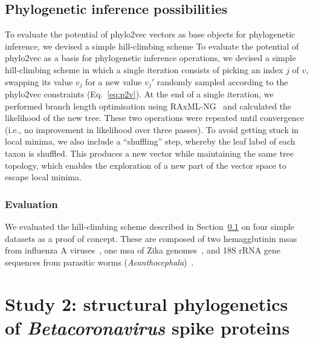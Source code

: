 \subsection{Phylogenetic inference possibilities}
\label{methods:p2v_inference}
To evaluate the potential of phylo2vec vectors as base objects for phylogenetic inference, we devised a simple hill-climbing scheme
To evaluate the potential of phylo2vec as a basis for phylogenetic inference operations, we devised a simple hill-climbing scheme in which a single iteration consists of picking an index $j$ of $v$, swapping its value $v_j$ for a new value $v_j'$ randomly sampled according to the phylo2vec constraints (Eq.~\ref{eq:p2v}). At the end of a single iteration, we performed branch length optimisation using RAxML-NG~\cite{kozlov2019} and calculated the likelihood of the new tree. These two operations were repeated until convergence (i.e., no improvement in likelihood over three passes). To avoid getting stuck in local minima, we also include a “shuffling” step, whereby the leaf label of each taxon is shuffled. This produces a new vector while maintaining the same tree topology, which enables the exploration of a new part of the vector space to escape local minima.

\subsubsection{Evaluation}
\label{methods:p2v_evaluation}
We evaluated the hill-climbing scheme described in Section~\ref{methods:p2v_inference} on four simple datasets as a proof of concept. These are composed of two hemagglutinin \glspl{msa} from influenza A viruses~\cite{sagulenko2018, fourment2019}, one \gls{msa} of Zika genomes~\cite{sanger1959}, and 18S rRNA gene sequences from parasitic worms (\textit{Acanthocephala})~\cite{Garey1996-jc}.  

\clearpage
\section{Study 2: structural phylogenetics of \textit{Betacoronavirus} spike proteins}

